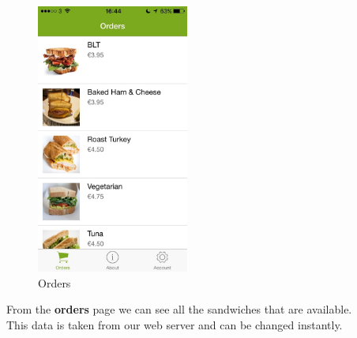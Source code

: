 \begin{minipage}{5cm}
	\begin{figure}[H]
		\includegraphics[width=5cm]{img/mobile-app/screen-shots/IMG_2907.jpg}
		\caption{Orders}
	\end{figure}
\end{minipage} \hfill
\begin{minipage}{0.55\textwidth}
From the \textbf{orders} page we can see all the sandwiches that are available.
\\

This data is taken from our web server and can be changed instantly.

\end{minipage}


